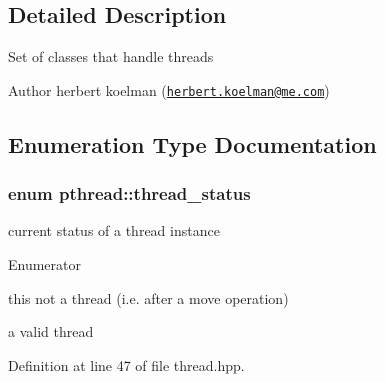 \subsection{Detailed Description}
Set of classes that handle threads

\begin{DoxyAuthor}{Author}
herbert koelman (\href{mailto:herbert.koelman@me.com}{\tt herbert.\+koelman@me.\+com}) 
\end{DoxyAuthor}


\subsection{Enumeration Type Documentation}
\hypertarget{group__threads_gac4b6e78f3d72c946ace7a92f3bec4101}{
\subsubsection[{thread\+\_\+status}]{\setlength{\rightskip}{0pt plus 5cm}enum {\bf pthread\+::thread\+\_\+status}\hspace{0.3cm}{\ttfamily [strong]}}}\label{group__threads_gac4b6e78f3d72c946ace7a92f3bec4101}
current status of a thread instance \begin{Desc}
\item[Enumerator]\par
\begin{description}
\item[{\em 
\hypertarget{group__threads_ggac4b6e78f3d72c946ace7a92f3bec4101a8414cd8c988083af4eabb1311df873cf}{not\+\_\+a\+\_\+thread}\label{group__threads_ggac4b6e78f3d72c946ace7a92f3bec4101a8414cd8c988083af4eabb1311df873cf}
}]this not a thread (i.\+e. after a move operation) \item[{\em 
\hypertarget{group__threads_ggac4b6e78f3d72c946ace7a92f3bec4101a13b3689524b86ca2caaee82399099df1}{a\+\_\+thread}\label{group__threads_ggac4b6e78f3d72c946ace7a92f3bec4101a13b3689524b86ca2caaee82399099df1}
}]a valid thread \end{description}
\end{Desc}


Definition at line 47 of file thread.\+hpp.



